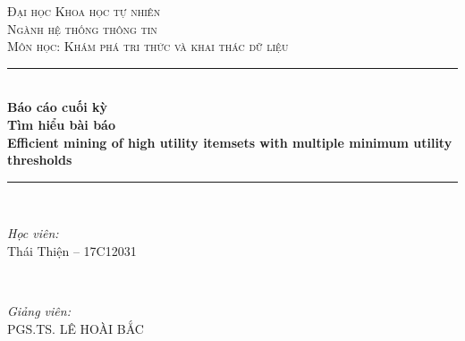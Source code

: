 \begin{titlepage}

\newcommand{\HRule}{\rule{\linewidth}{0.5mm}} %

\center %
 

\textsc{\LARGE Đại học Khoa học tự nhiên}\\[1.5cm] %
\textsc{\Large Ngành hệ thống thông tin}\\[0.5cm] %
\textsc{\large Môn học: Khám phá tri thức và khai thác dữ liệu }\\[0.5cm] %


\HRule \\[0.4cm]
{ \LARGE \bfseries Báo cáo cuối kỳ}\\[0.4cm]
{ \huge \bfseries Tìm hiểu bài báo}\\[0.2cm] %
{ \huge \bfseries Efficient mining of high utility itemsets with multiple minimum utility thresholds}\\[0.4cm] %
\HRule \\[1.5cm]
 

\begin{minipage}{0.4\textwidth}
\begin{flushleft} \large
\emph{Học viên:}\\
Thái Thiện  -- 17C12031 %
\end{flushleft}
\end{minipage}
~
\begin{minipage}{0.4\textwidth}
\begin{flushright} \large
\emph{Giảng viên:} \\
PGS.TS. LÊ HOÀI BẮC %
\end{flushright}
\end{minipage}\\[2cm]


\end{titlepage}
